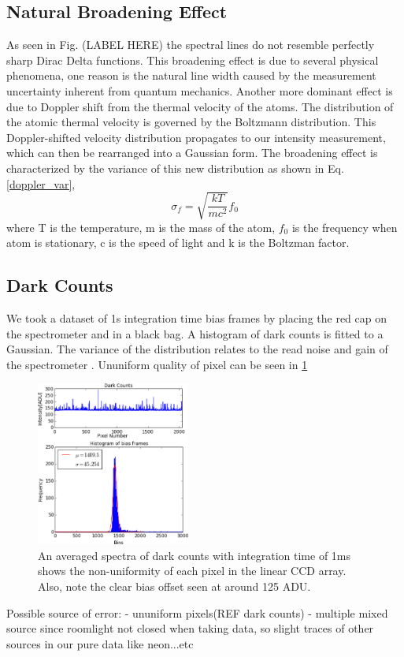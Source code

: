 \documentclass[authoryear, 12pt,5p, times]{elsarticle}
\begin{document}
	 \subsection{Natural Broadening Effect}
 As seen in Fig. (LABEL HERE) the spectral lines do not resemble perfectly sharp Dirac Delta functions. This broadening effect is due to several physical phenomena, one reason is the natural line width caused by the measurement uncertainty inherent from quantum mechanics. Another more dominant effect is due to Doppler shift from the thermal velocity of the atoms. The distribution of the atomic thermal velocity is governed by the Boltzmann distribution. This Doppler-shifted velocity distribution propagates to our intensity measurement, which can then be rearranged into a Gaussian form. The broadening effect is characterized by the variance of this new distribution as shown in  Eq. \ref{doppler_var},
 \begin{equation}\label{doppler_var}
\sigma_f = \sqrt{\frac{kT}{mc^2}}f_0
 \end{equation}
 where T is the temperature, m is the mass of the atom, $f_0$ is the frequency when atom is stationary, c is the speed of light and k is the Boltzman factor.
 
 \subsection{Dark Counts}
 We took a dataset of 1s integration time bias frames by placing the red cap on the spectrometer and in a black bag. A histogram of dark counts is fitted to a Gaussian. The variance of the distribution relates to the read noise and gain of the spectrometer \citep{ccd_handbook}.
 Ununiform quality of pixel can be seen in \ref{dark_counts}
 \begin{figure}[h!]
\includegraphics[width=0.45\textwidth]{figures/dark&biashisto}
\caption{An averaged spectra of dark counts with integration time of 1ms shows the non-uniformity of each pixel in the linear CCD array. Also, note the clear bias offset seen at around 125 ADU.} 
\label{dark_counts}
\end{figure}
Possible source of error: 
- ununiform pixels(REF dark counts)
- multiple mixed source since roomlight not closed when taking data, so slight traces of other sources in our pure data like neon...etc
\end{document}

